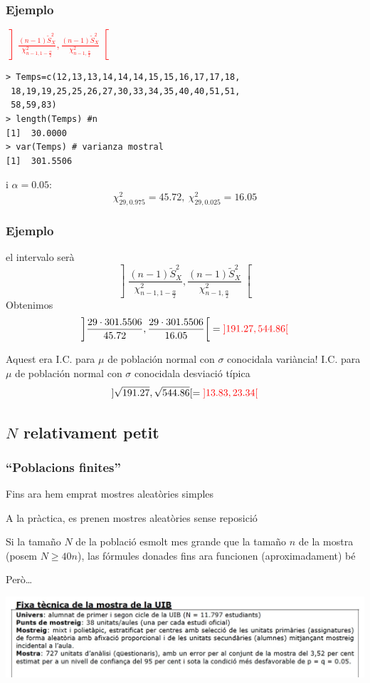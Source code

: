 \documentclass[12pt,t]{beamer}\usepackage[]{graphicx}\usepackage[]{color}
\newcommand{\red}[1]{\textcolor{red}{#1}}
\renewcommand{\geq}{\geqslant}
\theoremstyle{plain}
\theoremstyle{definition}
\begin{document}
\begin{frame}[fragile]
\frametitle{Ejemplo}
\red{$\displaystyle \left] \frac{(n-1)\widetilde{S}_{X}^2}{\chi_{n-1,1-\frac{\alpha}{2}}^2},
\frac{(n-1)\widetilde{S}_{X}^2}{\chi_{n-1,\frac{\alpha}{2}}^2}
\right[$}

\begin{verbatim}
> Temps=c(12,13,13,14,14,14,15,15,16,17,17,18,
 18,19,19,25,25,26,27,30,33,34,35,40,40,51,51,
 58,59,83)
> length(Temps) #n
[1]  30.0000
> var(Temps) # varianza mostral
[1]  301.5506
\end{verbatim}
i  $\alpha=0.05$:
$$
\chi_{29,0.975}^2=45.72,\
\chi_{29,0.025}^2=16.05
$$
\end{frame}

\begin{frame} 
\frametitle{Ejemplo}

el intervalo serà
$$
\left] \frac{(n-1)\widetilde{S}_{X}^2}{\chi_{n-1,1-\frac{\alpha}{2}}^2},
\frac{(n-1)\widetilde{S}_{X}^2}{\chi_{n-1,\frac{\alpha}{2}}^2}
\right[
$$
Obtenimos
$$
\left] \frac{29\cdot 301.5506}{45.72},
\frac{29\cdot 301.5506}{16.05}
\right[=
\red{]191.27, 544.86[}
$$
\pause

Aquest era I.C. para $\mu$ de población normal con $\sigma$ conocidala variància! I.C. para $\mu$ de población normal con $\sigma$ conocidala desviació típica
$$
]\sqrt{191.27}, \sqrt{544.86}[=\red{]13.83,23.34[}
$$

\end{frame}

\subsection{$N$ relativament petit}
\begin{frame}
\frametitle{``Poblacions finites''}
Fins ara hem emprat mostres aleatòries simples
\medskip

A la pràctica,  es prenen mostres aleatòries sense reposició
\medskip

Si la  tamaño  $N$ de la població esmolt mes grande que la  tamaño  $n$ de la mostra (posem $N\geq 40n$), las fórmules donades fins ara funcionen (aproximadament) bé
\medskip

Però\ldots
\vspace*{-4ex}

\begin{center}
\hspace*{-0.5cm}\includegraphics[width=1.1\linewidth]{plagiUIB2.jpg}
\end{center}


\end{frame}
\end{document}
